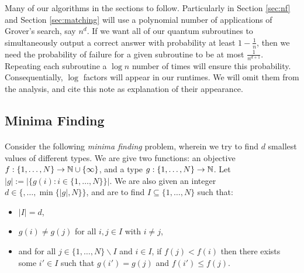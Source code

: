 \begin{note}\label{note:log}
Many of our algorithms in the sections to follow. Particularly in Section \ref{sec:nf} and Section \ref{sec:matching} will use a polynomial number of applications of Grover's search, say $n^d$. If we want all of our quantum subroutines to simultaneously output a correct answer with probability at least $1-\frac{1}{n}$, then we need the probability of failure for a given subroutine to be at most $\frac{1}{n^{d+1}}$. Repeating each subroutine a $\log n$ number of times will ensure this probability. Consequentially, $\log $ factors will appear in our runtimes. We will omit them from the analysis, and cite this note as explanation of their appearance.
\end{note}
\subsection{Minima Finding}
\paragraph{}
Consider the following {\it minima finding } problem, wherein we try to find $d$ smallest values of different types. We are give two functions: an objective $f: \{1, \dots, N\} \rightarrow \mathbb{N} \cup \{\infty\}$, and a type $g: \{1, \dots, N\} \rightarrow \mathbb{N}$. Let $|g| := | \{ g(i): i \in \{1,\dots, N\}\}|$. We are also given an integer $d \in \{, \dots, \min\{|g|, N\}\}$, and are to find $I \subseteq \{1, \dots, N\}$ such that:
\begin{itemize}
\item $|I| = d$,
\item $g(i) \neq g(j)$ for all $i,j \in I$ with $i\neq j$,
\item and for all $j \in \{1,\dots, N\}\backslash I$ and $i \in I$, if $f(j) < f(i)$ then there exists some $i' \in I$ such that $g(i') = g(j)$ and $f(i') \leq f(j)$.
\end{itemize}
